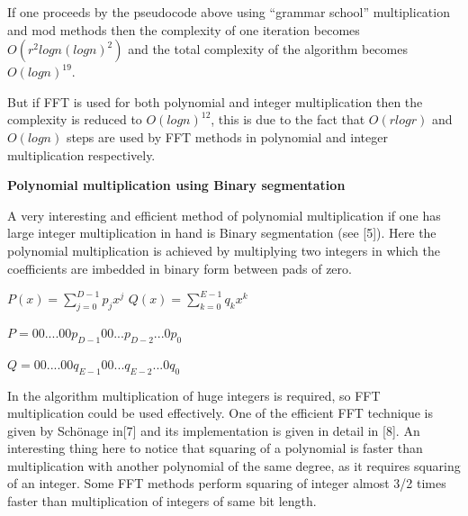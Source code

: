 \documentclass[a4paper,12pt]{article}
\begin{document}
\vspace{0.1in}
\begin{flushleft}
	If one proceeds by the pseudocode above using “grammar school” multiplication and
mod methods then the complexity of one iteration becomes \(O(r^2logn(logn)^2)\) and the total complexity of the algorithm becomes \(O(logn)^{19}\).
\end{flushleft}

\begin{flushleft}
	But if FFT is used for both polynomial and integer multiplication then the complexity is reduced to \(O(logn)^{12}\), this is due to the fact that \(O(rlogr)\) and \(O(logn)\) steps are used by FFT methods in polynomial and integer multiplication respectively.
\end{flushleft}

\begin{flushleft}
	\textbf{Polynomial multiplication using Binary segmentation}
\end{flushleft}

A very interesting and efficient method of polynomial multiplication if one has large integer multiplication in hand is Binary segmentation (see [5]). Here the polynomial multiplication is achieved by multiplying two integers in which the coefficients are imbedded in binary form between pads of zero.

\begin{center}
	\(P(x)=\sum_{j=0}^{D-1}p_{j}x^j\) \hspace{0.1cm} \(Q(x)=\sum_{k=0}^{E-1}q_{k}x^k\)
\end{center}

\begin{center}
	\(P = 00.... 00 p_{ D-1} 00... p_{D-2} ...0 p_{0}\)
\end{center}

\begin{center}
	\(Q = 00.... 00 q_{ E-1} 00... q_{E-2} ...0 q_{0}\)
\end{center}

In the algorithm multiplication of huge integers is required, so FFT multiplication could be used effectively. One of the efficient FFT technique is given by Schönage in[7] and its implementation is given in detail in [8]. An interesting thing here to notice that squaring of a polynomial is faster than
multiplication with another polynomial of the same degree, as it requires squaring of an integer. Some FFT methods perform squaring of integer almost 3/2 times faster than multiplication of integers of same bit length.
\end{document}

